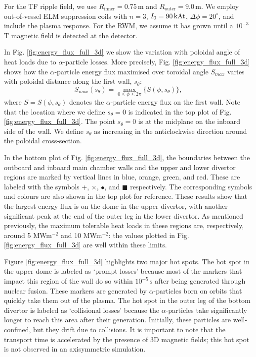 \documentclass[10pt, a4paper, twoside]{article}
\begin{document}
For the TF ripple field, we use $R_{\text{inner}} = 0.75\,\text{m}$ and $R_{\text{outer}} = 9.0\,\text{m}$. We employ out-of-vessel ELM suppression coils with $n=3$, $I_0= \text{90\,kAt}$, $\Delta \phi = 20^\circ$, and include the plasma response. For the RWM, we assume it has grown until a $10^{-3}$\,T magnetic field is detected at the detector.

In Fig. \ref{fig:energy_flux_full_3d} we show the variation with poloidal angle of heat loads due to $\alpha$-particle losses. More precisely, Fig. \ref{fig:energy_flux_full_3d} shows how the $\alpha$-particle energy flux maximised over toroidal angle $S_{max}$ varies with poloidal distance along the first wall, $s_\theta$:
\begin{equation}
    \label{eq:max_alpha_particle_energy_flux}
    S_{max}(s_\theta) = \max_{0\le \phi \le 2\pi}\{S(\phi, s_\theta)\},
\end{equation}
where $S=S(\phi, s_\theta)$ denotes the $\alpha$-particle energy flux on the first wall. Note that the location where we define \( s_\theta = 0 \) is indicated in the top plot of Fig. \ref{fig:energy_flux_full_3d}. The point \( s_\theta = 0 \) is at the midplane on the inboard side of the wall. We define \( s_\theta \) as increasing in the anticlockwise direction around the poloidal cross-section.

In the bottom plot of Fig. \ref{fig:energy_flux_full_3d}, the boundaries between the outboard and inboard main chamber walls and the upper and lower divertor regions are marked by vertical lines in blue, orange, green, and red. These are labeled with the symbols +, $\times$, $\bullet$, and $\blacksquare$ respectively. The corresponding symbols and colours are also shown in the top plot for reference. These results show that the largest energy flux is on the dome in the upper divertor, with another significant peak at the end of the outer leg in the lower divertor. As mentioned previously, the maximum tolerable heat loads in these regions are, respectively, around 5 MWm$^{-2}$ and 10 MWm$^{-2}$: the values plotted in Fig. \ref{fig:energy_flux_full_3d} are well within these limits. 

Figure \ref{fig:energy_flux_full_3d} highlights two major hot spots. The hot spot in the upper dome is labeled as `prompt losses' because most of the markers that impact this region of the wall do so within \(10^{-5}\,\text{s}\) after being generated through nuclear fusion. These markers are generated by $\alpha$-particles born on orbits that quickly take them out of the plasma. The hot spot in the outer leg of the bottom divertor is labeled as `collisional losses' because the $\alpha$-particles take significantly longer to reach this area after their generation. Initially, these particles are well-confined, but they drift due to collisions. It is important to note that the transport time is accelerated by the presence of 3D magnetic fields; this hot spot is not observed in an axisymmetric simulation.
\end{document}
